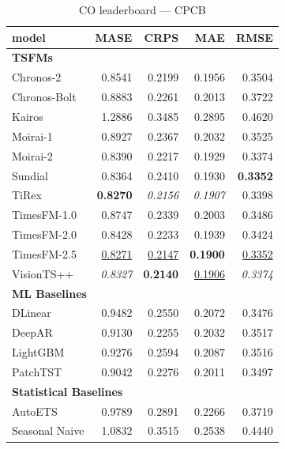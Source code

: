 \begin{table}[H]
\caption{CO leaderboard --- CPCB}
\centering
\begin{small}
\begin{tabular}{lrrrr}
\toprule
model & MASE & CRPS & MAE & RMSE \\
\midrule
\multicolumn{5}{l}{\textbf{TSFMs}} \\
Chronos-2 & 0.8541 & 0.2199 & 0.1956 & 0.3504 \\
Chronos-Bolt & 0.8883 & 0.2261 & 0.2013 & 0.3722 \\
Kairos & 1.2886 & 0.3485 & 0.2895 & 0.4620 \\
Moirai-1 & 0.8927 & 0.2367 & 0.2032 & 0.3525 \\
Moirai-2 & 0.8390 & 0.2217 & 0.1929 & 0.3374 \\
Sundial & 0.8364 & 0.2410 & 0.1930 & \textbf{0.3352} \\
TiRex & \textbf{0.8270} & \textit{0.2156} & \textit{0.1907} & 0.3398 \\
TimesFM-1.0 & 0.8747 & 0.2339 & 0.2003 & 0.3486 \\
TimesFM-2.0 & 0.8428 & 0.2233 & 0.1939 & 0.3424 \\
TimesFM-2.5 & \underline{0.8271} & \underline{0.2147} & \textbf{0.1900} & \underline{0.3352} \\
VisionTS++ & \textit{0.8327} & \textbf{0.2140} & \underline{0.1906} & \textit{0.3374} \\
\midrule
\multicolumn{5}{l}{\textbf{ML Baselines}} \\
DLinear & 0.9482 & 0.2550 & 0.2072 & 0.3476 \\
DeepAR & 0.9130 & 0.2255 & 0.2032 & 0.3517 \\
LightGBM & 0.9276 & 0.2594 & 0.2087 & 0.3516 \\
PatchTST & 0.9042 & 0.2276 & 0.2011 & 0.3497 \\
\midrule
\multicolumn{5}{l}{\textbf{Statistical Baselines}} \\
AutoETS & 0.9789 & 0.2891 & 0.2266 & 0.3719 \\
Seasonal Naive & 1.0832 & 0.3515 & 0.2538 & 0.4440 \\
\bottomrule
\end{tabular}
\end{small}
\end{table}